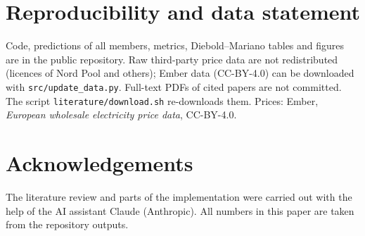 \documentclass[11pt,a4paper]{article}
\begin{document}
\section*{Reproducibility and data statement}
Code, predictions of all members, metrics, Diebold--Mariano tables and figures are in the public repository. Raw third-party price data are not redistributed (licences of Nord Pool and others); Ember data (CC-BY-4.0) can be downloaded with \texttt{src/update\_data.py}. Full-text PDFs of cited papers are not committed. The script \texttt{literature/download.sh} re-downloads them. Prices: Ember, \emph{European wholesale electricity price data}, CC-BY-4.0.

\section*{Acknowledgements}
The literature review and parts of the implementation were carried out with the help of the AI assistant Claude (Anthropic). All numbers in this paper are taken from the repository outputs.
\end{document}
